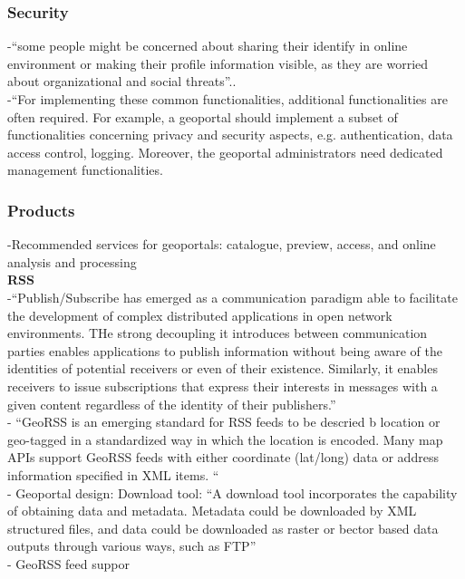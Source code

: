 \subsubsection{Security}
-{\color{orange}“some people might be concerned about sharing their identify in online environment or making their profile information visible, as they are worried about organizational and social threats”.}\cite{Afzalan2017}.\\
-{\color{orange}“For implementing these common functionalities, additional functionalities are often required. For example, a geoportal should implement a subset of functionalities concerning privacy and security aspects, e.g. authentication, data access control, logging. Moreover, the geoportal administrators need dedicated management functionalities. \cite{Jiang2020}}\\


\subsubsection{Products}
-{\color{orange}Recommended services for geoportals: catalogue, preview, access, and online analysis and processing \cite{Jiang2020}}\\
\textbf{RSS}\\
-{\color{orange}“Publish/Subscribe has emerged as a communication paradigm able to facilitate the development of complex distributed applications in open network environments. THe strong decoupling it introduces between communication parties enables applications to publish information without being aware of the identities of potential receivers or even of their existence.  Similarly, it enables receivers to issue subscriptions that express their interests in messages with a given content regardless of the identity of their publishers.”}\cite{Xing2015}\\
-{\color{orange} “GeoRSS is an emerging standard for RSS feeds to be descried b location or geo-tagged in a standardized way in which the location is encoded. Many map APIs support GeoRSS feeds with either coordinate (lat/long) data or address information specified in XML items. “}\cite{Xing2015}\\
-{\color{orange} Geoportal design: Download tool: ``A download tool incorporates the capability of obtaining data and metadata. Metadata could be downloaded by XML structured files, and data could be downloaded as raster or bector based data outputs through various ways, such as FTP'' \cite{Jiang2020}}\\
-{\color{orange} GeoRSS feed suppor \cite{Marshall2012}}\\

